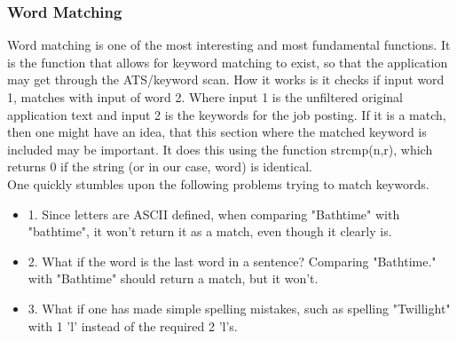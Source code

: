 \subsubsection{Word Matching}
Word matching is one of the most interesting and most fundamental functions. 
It is the function that allows for keyword matching to exist, so that the application
may get through the ATS/keyword scan. How it works is it checks if input word 1, matches with input of word 2.
Where input 1 is the unfiltered original application text and input 2 is the keywords for the job posting.
If it is a match, then one might have an idea, that this section where the matched keyword is included may be important.
It does this using the function strcmp(n,r), which returns 0 if the string (or in our case, word) is identical.
\\
One quickly stumbles upon the following problems trying to match keywords.
\begin{itemize}
  \item 1. Since letters are ASCII defined, when comparing "Bathtime" with "bathtime", it won't return it as a match, even though it clearly is.
  \item 2. What if the word is the last word in a sentence? Comparing "Bathtime." with "Bathtime" should return a match, but it won't.
  \item 3. What if one has made simple spelling mistakes, such as spelling "Twillight" with 1 'l' instead of the required 2 'l's.
\end{itemize}

